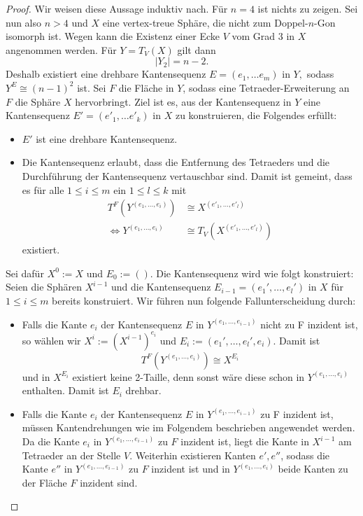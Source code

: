 \documentclass[12pt,titlepage,twoside,cleardoublepage]{article}
\theoremstyle{nummermitklammern}
\numberwithin{equation}{section}
\begin{document}
\begin{proof}
Wir weisen diese Aussage induktiv nach. Für $n=4$ ist nichts zu zeigen. Sei nun also $n>4$ und $X$ eine vertex-treue Sphäre, die nicht zum Doppel-$n$-Gon isomorph ist. 
Wegen  kann die Existenz einer Ecke $V$ vom Grad 3 in $X$ angenommen werden. Für $Y=T_V(X)$ gilt dann 
\[
\vert Y_2\vert=n-2.
\]
Deshalb existiert eine drehbare Kantensequenz $E=(e_1,\ldots e_m)$ in $Y,$ sodass $Y^E\cong (n-1)^2$ ist. Sei $F$ die Fläche in $Y$, sodass eine Tetraeder-Erweiterung an $F$ die Sphäre $X$ hervorbringt. Ziel ist es, aus der Kantensequenz in $Y$ eine Kantensequenz $E'=(e'_1,\ldots e'_k)$ in $X$ zu konstruieren, die Folgendes erfüllt:
\begin{itemize}
\item $E'$ ist eine drehbare Kantensequenz.
\item Die Kantensequenz erlaubt, dass die Entfernung des Tetraeders und die Durchführung der Kantensequenz vertauschbar sind. Damit ist gemeint, dass es für alle $1\leq i\leq m$ ein $1\leq l \leq k$ mit 
\begin{align*}
T^F(Y^{(e_1,\ldots, e_i)})&\cong X^{(e'_1,\ldots,e'_l)} \\
\Leftrightarrow Y^{(e_1,\ldots, e_i)}&\cong T_V(X^{(e'_1,\ldots,e'_l)})
\end{align*} 
existiert.
\end{itemize}
Sei dafür $X^0:=X$ und $E_0:=().$ Die Kantensequenz wird wie folgt konstruiert: Seien die Sphären $X^{i-1}$ und die Kantensequenz $E_{i-1}=(e_1',\ldots,e_l')$ in $X$ für $1\leq i \leq m$ bereits konstruiert. Wir führen nun folgende Fallunterscheidung durch:
\begin{itemize}
\item Falls die Kante $e_{i}$ der Kantensequenz $E$ in $Y^{(e_1,\ldots,e_{i-1})}$ nicht zu F inzident ist, so wählen wir $X^{i}:={(X^{i-1})}^{e_i}$ und $E_{i}:=(e_1',\ldots,e_l',e_i)$. Damit ist 
\[
T^F(Y^{(e_1,\ldots,e_i)})\cong X^{E_{i}}
\]
und in $X^{E_{i}}$ existiert keine 2-Taille, denn sonst wäre diese schon in $Y^{(e_1,\ldots,e_i)}$ enthalten. Damit ist $E_{i}$ drehbar.
\item Falls die Kante $e_i$ der Kantensequenz $E$ in $Y^{(e_1,\ldots,e_{i-1})}$ zu F inzident ist, müssen Kantendrehungen wie im Folgendem beschrieben angewendet werden. Da die Kante $e_i$ in $Y^{(e_1,\ldots,e_{i-1})}$ zu $F$ inzident ist, liegt die Kante in $X^{i-1}$ am Tetraeder an der Stelle $V.$
Weiterhin existieren Kanten $e',e''$, sodass die Kante $e''$ in $Y^{(e_1,\ldots,e_{i-1})}$ zu $F$ inzident ist und in $Y^{(e_1,\ldots,e_{i})}$ beide Kanten zu der Fläche $F$ inzident sind.

\end{itemize}
\end{proof}
\end{document}
